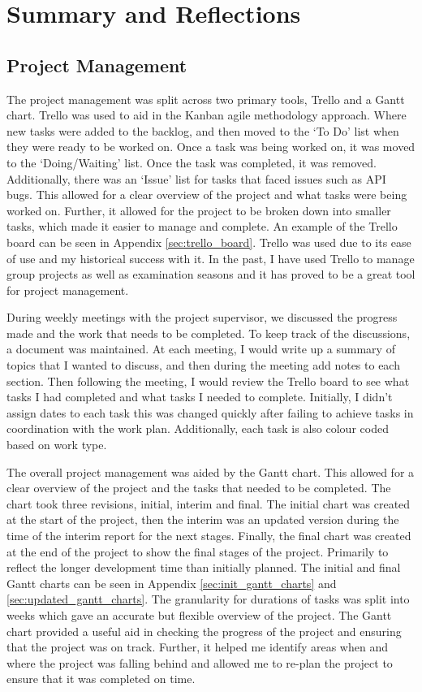 \documentclass [11pt,a4paper]{article}
\begin{document}
\pagebreak
\section{Summary and Reflections}
\label{sec:summary}
\subsection{Project Management}
\label{sec:project_management_summary}

The project management was split across two primary tools, Trello and a Gantt chart. Trello was used to aid in the Kanban agile methodology approach. Where new tasks were added to the backlog, and then moved to the `To Do' list when they were ready to be worked on. Once a task was being worked on, it was moved to the `Doing/Waiting' list. Once the task was completed, it was removed. Additionally, there was an `Issue' list for tasks that faced issues such as API bugs. This allowed for a clear overview of the project and what tasks were being worked on. Further, it allowed for the project to be broken down into smaller tasks, which made it easier to manage and complete. An example of the Trello board can be seen in Appendix \ref{sec:trello_board}. Trello was used due to its ease of use and my historical success with it. In the past, I have used Trello to manage group projects as well as examination seasons and it has proved to be a great tool for project management.

During weekly meetings with the project supervisor, we discussed the progress made and the work that needs to be completed. To keep track of the discussions, a document was maintained. At each meeting, I would write up a summary of topics that I wanted to discuss, and then during the meeting add notes to each section. Then following the meeting, I would review the Trello board to see what tasks I had completed and what tasks I needed to complete. Initially, I didn't assign dates to each task this was changed quickly after failing to achieve tasks in coordination with the work plan. Additionally, each task is also colour coded based on work type.

The overall project management was aided by the Gantt chart. This allowed for a clear overview of the project and the tasks that needed to be completed. The chart took three revisions, initial, interim and final. The initial chart was created at the start of the project, then the interim was an updated version during the time of the interim report for the next stages. Finally, the final chart was created at the end of the project to show the final stages of the project. Primarily to reflect the longer development time than initially planned. The initial and final Gantt charts can be seen in Appendix \ref{sec:init_gantt_charts} and \ref{sec:updated_gantt_charts}. The granularity for durations of tasks was split into weeks which gave an accurate but flexible overview of the project. The Gantt chart provided a useful aid in checking the progress of the project and ensuring that the project was on track. Further, it helped me identify areas when and where the project was falling behind and allowed me to re-plan the project to ensure that it was completed on time.
\end{document}
